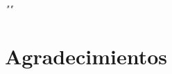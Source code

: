 {
	\vspace*{1cm}
	\begin{flushright}
		\textit{""}\\
		\vspace{10pt}
		
	\end{flushright}
	
	\vspace*{14cm}
	\begin{flushright}
		\textit{}
	\end{flushright}
}

\chapter*{Agradecimientos}


\begin{flushright}
	\emph{}
\end{flushright}